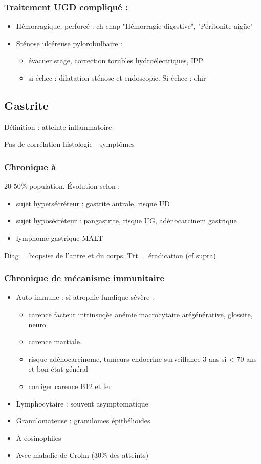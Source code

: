 \documentclass[11pt]{article}
\begin{document}
\subsubsection{Traitement UGD compliqué :}
\label{sec:orgf1748ee}
\begin{itemize}
\item Hémorragique, perforcé : ch chap "Hémorragie digestive", "Péritonite aigüe"
\item Sténose ulcéreuse pylorobulbaire :
\begin{itemize}
\item évacuer stage, correction torubles hydroélectriques, IPP
\item si échec : dilatation sténose et endoscopie. Si échec : chir
\end{itemize}
\end{itemize}

\subsection{Gastrite}
\label{sec:orgb95904d}
Définition : atteinte inflammatoire

Pas de corrélation histologie - symptômes

\subsubsection{Chronique à }
\label{sec:org4ae93bc}
20-50\% population. Évolution selon :
\begin{itemize}
\item sujet hypersécréteur : gastrite antrale, risque UD
\item sujet hyposécréteur : pangastrite, risque UG, adénocarcinem gastrique
\item lymphome gastrique MALT
\end{itemize}
Diag = biopsise de l'antre et du corps. Ttt = éradication (cf supra)

\subsubsection{Chronique de mécanisme immunitaire}
\label{sec:org5de089c}
\begin{itemize}
\item Auto-immune : si atrophie fundique sévère : 
\begin{itemize}
\item carence facteur intrinsuqèe \thus
anémie macrocytaire arégénérative, glossite, neuro
\item carence martiale
\item risque adénocarcinome, tumeurs endocrine \thus surveillance 3 ans si < 70
ans et bon état général
\item corriger carence B12 et fer
\end{itemize}
\item Lymphocytaire : souvent asymptomatique
\item Granulomateuse : granulomes épithélioïdes
\item À éosinophiles
\item Avec maladie de Crohn (30\% des atteints)
\end{itemize}
\end{document}
